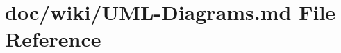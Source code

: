 \hypertarget{_u_m_l-_diagrams_8md}{}\section{doc/wiki/\+U\+M\+L-\/\+Diagrams.md File Reference}
\label{_u_m_l-_diagrams_8md}
